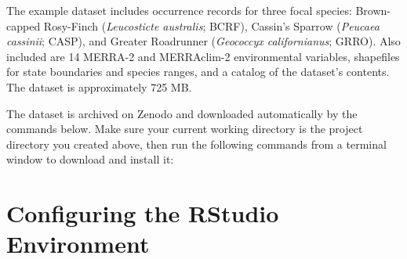 \documentclass[
  letterpaper,
  DIV=11,
  numbers=noendperiod]{scrartcl}
\newenvironment{Shaded}{\begin{snugshade}}{\end{snugshade}}
\newcommand{\AttributeTok}[1]{\textcolor[rgb]{0.40,0.45,0.13}{#1}}
\newcommand{\BuiltInTok}[1]{\textcolor[rgb]{0.00,0.23,0.31}{#1}}
\newcommand{\CommentTok}[1]{\textcolor[rgb]{0.37,0.37,0.37}{#1}}
\newcommand{\ExtensionTok}[1]{\textcolor[rgb]{0.00,0.23,0.31}{#1}}
\newcommand{\FunctionTok}[1]{\textcolor[rgb]{0.28,0.35,0.67}{#1}}
\newcommand{\NormalTok}[1]{\textcolor[rgb]{0.00,0.23,0.31}{#1}}
\newcommand{\OperatorTok}[1]{\textcolor[rgb]{0.37,0.37,0.37}{#1}}
\newcommand{\StringTok}[1]{\textcolor[rgb]{0.13,0.47,0.30}{#1}}
\newcommand{\VariableTok}[1]{\textcolor[rgb]{0.07,0.07,0.07}{#1}}
\begin{document}
The example dataset includes occurrence records for three focal species:
Brown-capped Rosy-Finch (\emph{Leucosticte australis}; BCRF), Cassin's
Sparrow (\emph{Peucaea cassinii}; CASP), and Greater Roadrunner
(\emph{Geococcyx californianus}; GRRO). Also included are 14 MERRA-2 and
MERRAclim-2 environmental variables, shapefiles for state boundaries and
species ranges, and a catalog of the dataset's contents. The dataset is
approximately 725 MB.

The dataset is archived on Zenodo and downloaded automatically by the
commands below. Make sure your current working directory is the project
directory you created above, then run the following commands from a
terminal window to download and install it:

\begin{Shaded}
\end{Shaded}

\section{Configuring the RStudio
Environment}\label{configuring-the-rstudio-environment}
\end{document}
